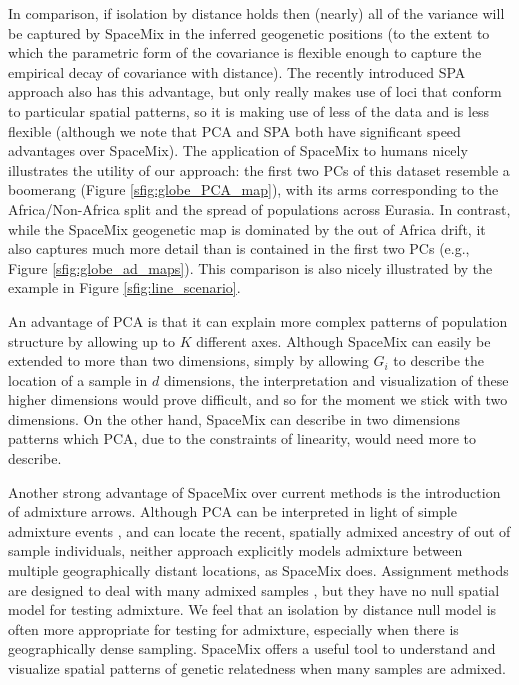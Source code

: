 \documentclass[12pt]{article}
\begin{document}
In comparison, if isolation by distance holds then (nearly) all of the variance will be captured by SpaceMix in the inferred geogenetic positions 
(to the extent to which the parametric form of the covariance is flexible enough to capture the empirical decay of covariance with distance). 
The recently introduced SPA approach \citep{yang_model-based_2012} also has this advantage, 
but only really makes use of loci that conform to particular spatial patterns,
so it is making use of less of the data and is less flexible 
(although we note that PCA and SPA both have significant speed advantages over SpaceMix).  
The application of SpaceMix to humans nicely illustrates the utility of our approach: 
the first two PCs of this dataset resemble a boomerang (Figure \ref{sfig:globe_PCA_map}), 
with its arms corresponding to the Africa/Non-Africa split and the spread of populations across Eurasia. 
In contrast, while the SpaceMix geogenetic map is dominated by the out of Africa drift, 
it also captures much more detail than is contained in the first two PCs (e.g., Figure \ref{sfig:globe_ad_maps}).
This comparison is also nicely illustrated by the example in Figure \ref{sfig:line_scenario}.

An advantage of PCA is that it can explain more complex patterns of population structure by allowing up to $K$ different axes.
Although SpaceMix can easily be extended to more than two dimensions, 
simply by allowing $G_i$ to describe the location of a sample in $d$ dimensions, 
the interpretation and visualization of these higher dimensions would prove difficult, 
and so for the moment we stick with two dimensions.
On the other hand, SpaceMix can describe in two dimensions patterns which PCA,
due to the constraints of linearity, would need more to describe.

Another strong advantage of SpaceMix over current methods is the introduction of admixture arrows. 
Although PCA can be interpreted in light of simple admixture events \citep{mcvean_genealogical_2009}, 
and \citet{yang_model-based_2012,yang_spatial_2014} can locate the recent, spatially admixed ancestry of out of sample individuals,
neither approach explicitly models admixture between multiple geographically distant locations,
as SpaceMix does.
Assignment methods are designed to deal with many admixed samples \citep{STRUCTURE}, 
but they have no null spatial model for testing admixture.
We feel that an isolation by distance null model is often more appropriate for testing for admixture, 
especially when there is geographically dense sampling. 
SpaceMix offers a useful tool to understand and visualize spatial patterns of genetic relatedness when many samples are admixed. 
\end{document}
